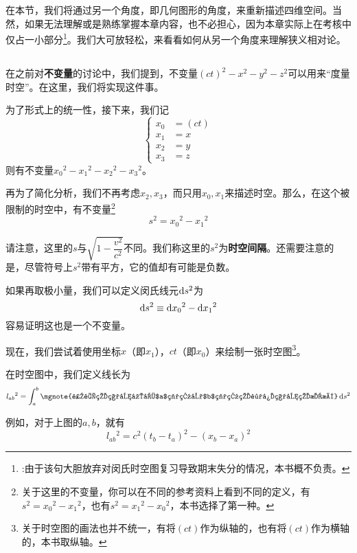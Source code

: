 \section[相对论的几何表述]{ }
在本节，我们将通过另一个角度，即几何图形的角度，来重新描述四维空间。当然，如果无法理解或是熟练掌握本章内容，也不必担心，因为本章实际上在考核中仅占一小部分\footnote{\dove :由于该句大胆放弃对闵氏时空图复习导致期末失分的情况，本书概不负责。}。我们大可放轻松，来看看如何从另一个角度来理解狭义相对论。
\subsection[闵氏时空]{}
在之前对\textbf{不变量}的讨论中，我们提到，不变量$(ct)^2-x^2-y^2-z^2$可以用来``度量时空''。在这里，我们将实现这件事。

为了形式上的统一性，接下来，我们记
\[\left\{\begin{aligned}
	x_0&=(ct)\\
	x_1&=x\\
	x_2&=y\\
	x_3&=z
\end{aligned}\right.\]
则有不变量$x_0{}^2-x_1{}^2-x_2{}^2-x_3{}^2$。

再为了简化分析，我们不再考虑$x_2,x_3$，而只用$x_0,x_1$来描述时空。那么，在这个被限制的时空中，有不变量\footnote{关于这里的不变量，你可以在不同的参考资料上看到不同的定义，有$s^2=x_0{}^2-x_1{}^2$，也有$s^2=x_1{}^2-x_0{}^2$，本书选择了第一种。}
\[s^2=x_0{}^2-x_1{}^2\]

请注意，这里的$s$与$\sqrt{1-\dfrac{v^2}{c^2}}$不同。我们称这里的$s^2$为\textbf{时空间隔}。还需要注意的是，尽管符号上$s^2$带有平方，它的值却有可能是负数。

如果再取极小量，我们可以定义闵氏线元$\dif s^2$为
\[\dif s^2\equiv \dif x_0{}^2-\dif x_1{}^2\]
容易证明这也是一个不变量。

现在，我们尝试着使用坐标$x$（即$x_1$），$ct$（即$x_0$）来绘制一张时空图\footnote{关于时空图的画法也并不统一，有将$(ct)$作为纵轴的，也有将$(ct)$作为横轴的，本书取纵轴。}。

在时空图中，我们定义线长为
\[l_{ab}{}^2=\int_{a}^{b}\mgnote{这里的积分应取$a$端点到$b$端点的路径积分的意思} \dif s^2\] 

例如，对于上图的$a,b$，就有
\[l_{ab}{}^2=c^2(t_b-t_a)^2-(x_b-x_a)^2\]

